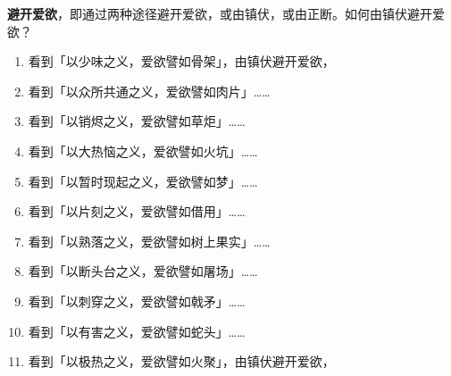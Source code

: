 \textbf{避开爱欲}，即通过两种途径避开爱欲，或由镇伏，或由正断。如何由镇伏避开爱欲？

\begin{enumerate}
    \item 看到「以少味之义，爱欲譬如骨架」，由镇伏避开爱欲，
    \item 看到「以众所共通之义，爱欲譬如肉片」……
    \item 看到「以销烬之义，爱欲譬如草炬」……
    \item 看到「以大热恼之义，爱欲譬如火坑」……
    \item 看到「以暂时现起之义，爱欲譬如梦」……
    \item 看到「以片刻之义，爱欲譬如借用」……
    \item 看到「以熟落之义，爱欲譬如树上果实」……
    \item 看到「以断头台之义，爱欲譬如屠场」……
    \item 看到「以刺穿之义，爱欲譬如戟矛」……
    \item 看到「以有害之义，爱欲譬如蛇头」……
    \item 看到「以极热之义，爱欲譬如火聚」，由镇伏避开爱欲，
\end{enumerate}



